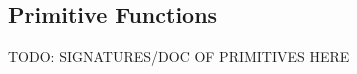 \subsection{Primitive Functions}
\label{sec:appendix1}

\begin{code}
  TODO: SIGNATURES/DOC OF PRIMITIVES HERE
\end{code}
